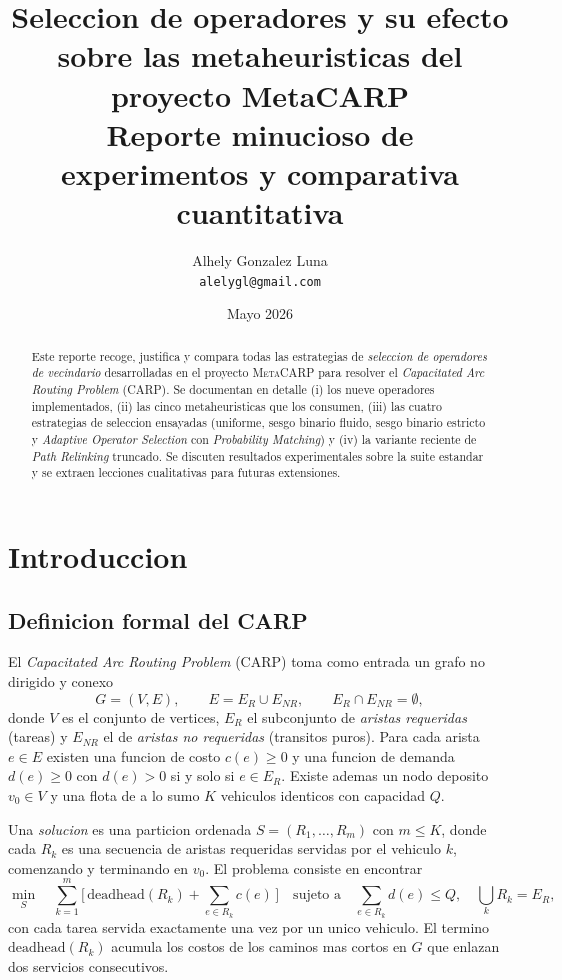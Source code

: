 \documentclass[11pt,a4paper]{article}
\title{\textbf{Seleccion de operadores y su efecto sobre las
metaheuristicas del proyecto MetaCARP}\\[4pt]
\large Reporte minucioso de experimentos
y comparativa cuantitativa}
\author{Alhely Gonzalez Luna\\\small \texttt{alelygl@gmail.com}}
\date{Mayo 2026}
\newcommand{\carp}{CARP}
\begin{document}
\maketitle

\begin{abstract}
\noindent Este reporte recoge, justifica y compara todas las estrategias
de \emph{seleccion de operadores de vecindario} desarrolladas en el
proyecto \textsc{MetaCARP} para resolver el \emph{Capacitated Arc
Routing Problem} (\carp). Se documentan en detalle (i) los nueve
operadores implementados, (ii) las cinco metaheuristicas que los
consumen, (iii) las cuatro estrategias de seleccion ensayadas
(uniforme, sesgo binario fluido, sesgo binario estricto y
\emph{Adaptive Operator Selection} con \emph{Probability Matching}) y
(iv) la variante reciente de \emph{Path Relinking} truncado. Se
discuten resultados experimentales sobre la suite estandar y se
extraen lecciones cualitativas para futuras extensiones.
\end{abstract}

\tableofcontents
\newpage

\section{Introduccion}

\subsection{Definicion formal del \carp}

El \emph{Capacitated Arc Routing Problem} (\carp) toma como entrada un
grafo no dirigido y conexo
\begin{equation}
G = (V, E),\qquad
E = E_R \cup E_{NR},\qquad E_R \cap E_{NR} = \emptyset,
\end{equation}
donde $V$ es el conjunto de vertices, $E_R$ el subconjunto de
\emph{aristas requeridas} (tareas) y $E_{NR}$ el de \emph{aristas no
requeridas} (transitos puros). Para cada arista $e \in E$ existen una
funcion de costo $c(e) \ge 0$ y una funcion de demanda
$d(e) \ge 0$ con $d(e) > 0$ si y solo si $e \in E_R$. Existe ademas un
nodo deposito $v_0 \in V$ y una flota de a lo sumo $K$ vehiculos
identicos con capacidad $Q$.

Una \emph{solucion} es una particion ordenada $S=(R_1,\dots,R_m)$ con
$m\le K$, donde cada $R_k$ es una secuencia de aristas requeridas
servidas por el vehiculo $k$, comenzando y terminando en $v_0$. El
problema consiste en encontrar
\begin{equation}\label{eq:carp}
\min_{S} \quad
\sum_{k=1}^{m} \bigl[\, \text{deadhead}(R_k) + \sum_{e\in R_k} c(e)\,\bigr]
\quad\text{sujeto a}\quad
\sum_{e\in R_k} d(e) \le Q,\quad
\bigcup_{k} R_k = E_R,
\end{equation}
con cada tarea servida exactamente una vez por un unico vehiculo. El
termino $\text{deadhead}(R_k)$ acumula los costos de los caminos mas
cortos en $G$ que enlazan dos servicios consecutivos.
\end{document}
